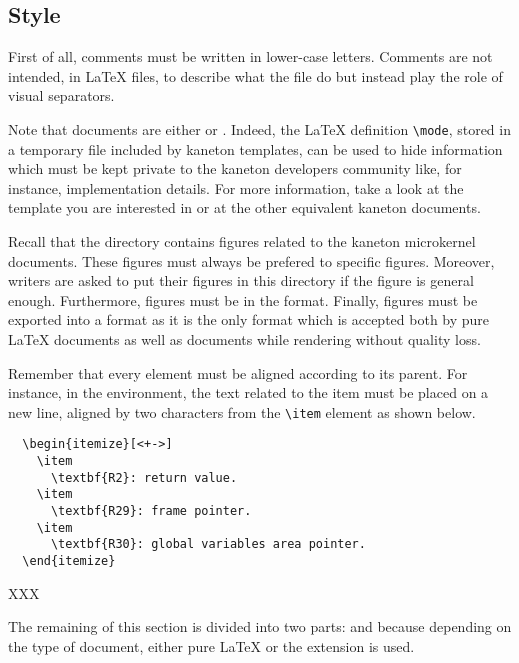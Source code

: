 %
%

\subsection{Style}

First of all, comments must be written in lower-case letters. Comments
are not intended, in {\LaTeX} files, to describe what the file do but instead
play the role of visual separators.

Note that documents are either  or . Indeed,
the {\LaTeX} definition \verb|\mode|, stored in a temporary file
included by kaneton templates, can be used to hide information which must be
kept private to the kaneton developers community like, for instance,
implementation details. For more information, take a look at the template
you are interested in or at the other equivalent kaneton documents.

Recall that the  directory contains figures related
to the kaneton microkernel documents. These figures must always be prefered
to specific figures. Moreover, writers are asked to put their figures in
this directory if the figure is general enough. Furthermore, figures must be
in the  format. Finally, figures must be exported into a
 format as it is the only format which is accepted both by
pure {\LaTeX} documents as well as  documents while rendering
without quality loss.

Remember that every element must be aligned according to its parent. For
instance, in the  environment, the text related to the item
must be placed on a new line, aligned by two characters from the \verb|\item|
element as shown below.

\begin{verbatim}
  \begin{itemize}[<+->]
    \item
      \textbf{R2}: return value.
    \item
      \textbf{R29}: frame pointer.
    \item
      \textbf{R30}: global variables area pointer.
  \end{itemize}
\end{verbatim}

XXX

The remaining of this section is divided into two parts:  and
 because depending on the type of document, either pure
{\LaTeX} or the  extension is used.

